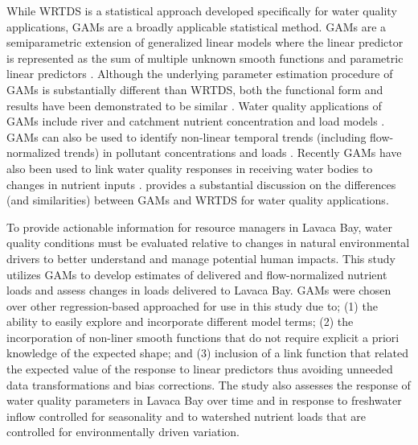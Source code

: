 \documentclass[sn-basic,referee,lineno,pdflatex]{sn-jnl}
\begin{document}
While WRTDS is a statistical approach developed specifically for water
quality applications, GAMs are a broadly applicable statistical method.
GAMs are a semiparametric extension of generalized linear models where
the linear predictor is represented as the sum of multiple unknown
smooth functions and parametric linear predictors
\citep{woodFastStableRestricted2011}. Although the underlying parameter
estimation procedure of GAMs is substantially different than WRTDS, both
the functional form and results have been demonstrated to be similar
\citep{beckNumericalQualitativeContrasts2017}. Water quality
applications of GAMs include river and catchment nutrient concentration
and load models
\citep{wangLoadEstimationUncertainties2011, kroonRiverLoadsSuspended2012, kuhnertQuantifyingTotalSuspended2012, robson_prediction_2015-1, hagemannEstimatingNutrientOrganic2016, mcdowell_implications_2021, biagi_novel_2022}.
GAMs can also be used to identify non-linear temporal trends (including
flow-normalized trends) in pollutant concentrations and loads
\citep{beckNumericalQualitativeContrasts2017, murphyGeneralizedAdditiveModel2019}.
Recently GAMs have also been used to link water quality responses in
receiving water bodies to changes in nutrient inputs
\citep{murphyNutrientImprovementsChesapeake2022}.
\citet{beckNumericalQualitativeContrasts2017} provides a substantial
discussion on the differences (and similarities) between GAMs and WRTDS
for water quality applications.

To provide actionable information for resource managers in Lavaca Bay,
water quality conditions must be evaluated relative to changes in
natural environmental drivers to better understand and manage potential
human impacts. This study utilizes GAMs to develop estimates of
delivered and flow-normalized nutrient loads and assess changes in loads
delivered to Lavaca Bay. GAMs were chosen over other regression-based
approached for use in this study due to; (1) the ability to easily
explore and incorporate different model terms; (2) the incorporation of
non-liner smooth functions that do not require explicit a priori
knowledge of the expected shape; and (3) inclusion of a link function
that related the expected value of the response to linear predictors
thus avoiding unneeded data transformations and bias corrections. The
study also assesses the response of water quality parameters in Lavaca
Bay over time and in response to freshwater inflow controlled for
seasonality and to watershed nutrient loads that are controlled for
environmentally driven variation.
\end{document}
